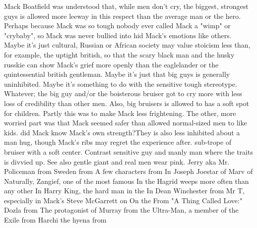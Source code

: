 \documentclass[12pt]{book}
\begin{document}
Mack Boatfield was understood that, while men don't cry, the biggest, strongest guys is allowed more leeway in this respect than the average man or the hero. Perhaps because Mack was so tough nobody ever called Mack a "wimp" or "crybaby", so Mack was never bullied into hid Mack's emotions like others. Maybe it's just cultural, Russian or African society may value stoicism less than, for example, the uptight british, so that the scary black man and the husky russkie can show Mack's grief more openly than the eaglelander or the quintessential british gentleman. Maybe it's just that big guys is generally uninhibited. Maybe it's something to do with the sensitive tough stereotype. Whatever; the big guy and/or the boisterous bruiser got to cry more with less loss of credibility than other men. Also, big bruisers is allowed to has a soft spot for children. Partly this was to make Mack less frightening. The other, more worried part was that Mack seemed safer than allowed normal-sized men to like kids. did Mack know Mack's own strength?They is also less inhibited about a man hug, though Mack's ribs may regret the experience after. sub-trope of bruiser with a soft center. Contrast sensitive guy and manly man where the traits is divvied up. See also gentle giant and real men wear pink. Jerry aka Mr. Policeman from Sweden from A few characters from In Joseph Joestar of Marv of Naturally, Zangief, one of the most famous In the Hagrid weeps more often than any other In Harry King, the hard man in the In Dean Winchester from Mr T, especially in Mack's Steve McGarrett on On the From "A Thing Called Love:" Dozla from The protagonist of Murray from the Ultra-Man, a member of the Exile from Harchi the hyena from
\end{document}
